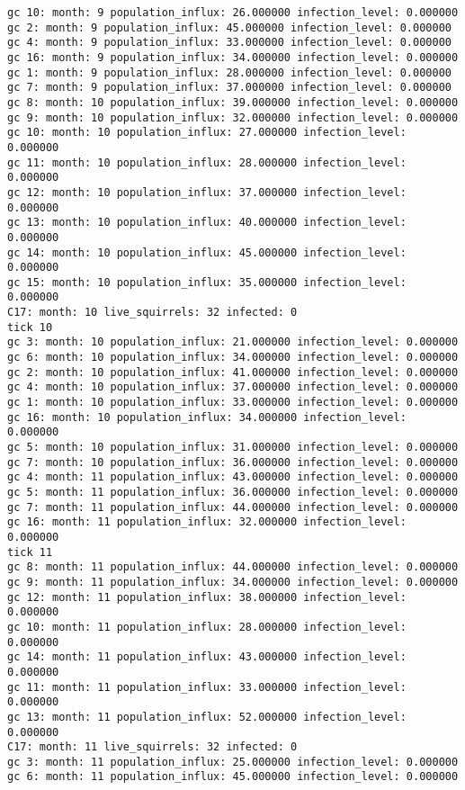 \begin{lstlisting}[basicstyle=\tiny]
gc 10: month: 9 population_influx: 26.000000 infection_level: 0.000000
gc 2: month: 9 population_influx: 45.000000 infection_level: 0.000000
gc 4: month: 9 population_influx: 33.000000 infection_level: 0.000000
gc 16: month: 9 population_influx: 34.000000 infection_level: 0.000000
gc 1: month: 9 population_influx: 28.000000 infection_level: 0.000000
gc 7: month: 9 population_influx: 37.000000 infection_level: 0.000000
gc 8: month: 10 population_influx: 39.000000 infection_level: 0.000000
gc 9: month: 10 population_influx: 32.000000 infection_level: 0.000000
gc 10: month: 10 population_influx: 27.000000 infection_level: 0.000000
gc 11: month: 10 population_influx: 28.000000 infection_level: 0.000000
gc 12: month: 10 population_influx: 37.000000 infection_level: 0.000000
gc 13: month: 10 population_influx: 40.000000 infection_level: 0.000000
gc 14: month: 10 population_influx: 45.000000 infection_level: 0.000000
gc 15: month: 10 population_influx: 35.000000 infection_level: 0.000000
C17: month: 10 live_squirrels: 32 infected: 0
tick 10
gc 3: month: 10 population_influx: 21.000000 infection_level: 0.000000
gc 6: month: 10 population_influx: 34.000000 infection_level: 0.000000
gc 2: month: 10 population_influx: 41.000000 infection_level: 0.000000
gc 4: month: 10 population_influx: 37.000000 infection_level: 0.000000
gc 1: month: 10 population_influx: 33.000000 infection_level: 0.000000
gc 16: month: 10 population_influx: 34.000000 infection_level: 0.000000
gc 5: month: 10 population_influx: 31.000000 infection_level: 0.000000
gc 7: month: 10 population_influx: 36.000000 infection_level: 0.000000
gc 4: month: 11 population_influx: 43.000000 infection_level: 0.000000
gc 5: month: 11 population_influx: 36.000000 infection_level: 0.000000
gc 7: month: 11 population_influx: 44.000000 infection_level: 0.000000
gc 16: month: 11 population_influx: 32.000000 infection_level: 0.000000
tick 11
gc 8: month: 11 population_influx: 44.000000 infection_level: 0.000000
gc 9: month: 11 population_influx: 34.000000 infection_level: 0.000000
gc 12: month: 11 population_influx: 38.000000 infection_level: 0.000000
gc 10: month: 11 population_influx: 28.000000 infection_level: 0.000000
gc 14: month: 11 population_influx: 43.000000 infection_level: 0.000000
gc 11: month: 11 population_influx: 33.000000 infection_level: 0.000000
gc 13: month: 11 population_influx: 52.000000 infection_level: 0.000000
C17: month: 11 live_squirrels: 32 infected: 0
gc 3: month: 11 population_influx: 25.000000 infection_level: 0.000000
gc 6: month: 11 population_influx: 45.000000 infection_level: 0.000000

\end{lstlisting}
